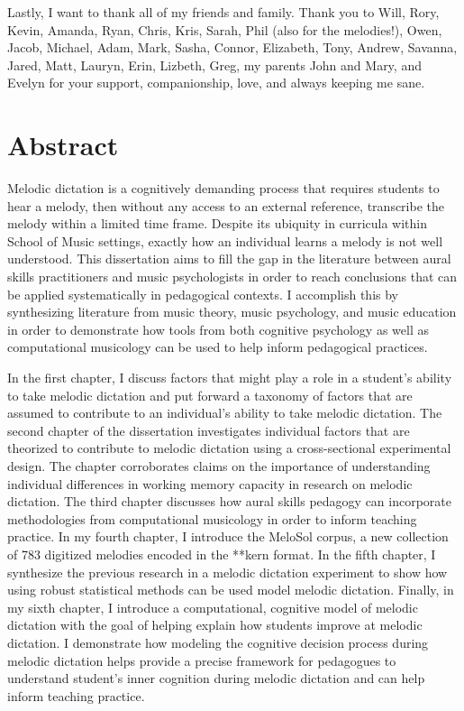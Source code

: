 \documentclass[12pt,]{book}
\begin{document}
Lastly, I want to thank all of my friends and family.
Thank you to Will, Rory, Kevin, Amanda, Ryan, Chris, Kris, Sarah, Phil (also for the melodies!), Owen, Jacob, Michael, Adam, Mark, Sasha, Connor, Elizabeth, Tony, Andrew, Savanna, Jared, Matt, Lauryn, Erin, Lizbeth, Greg, my parents John and Mary, and Evelyn for your support, companionship, love, and always keeping me sane.

{
\setcounter{tocdepth}{1}
\tableofcontents
}
\listoftables
\listoffigures
\cleardoublepage\newpage
\chapter{Abstract}

Melodic dictation is a cognitively demanding process that requires students to hear a melody, then without any access to an external reference, transcribe the melody within a limited time frame.
Despite its ubiquity in curricula within School of Music settings, exactly how an individual learns a melody is not well understood.
This dissertation aims to fill the gap in the literature between aural skills practitioners and music psychologists in order to reach conclusions that can be applied systematically in pedagogical contexts.
I accomplish this by synthesizing literature from music theory, music psychology, and music education in order to demonstrate how tools from both cognitive psychology as well as computational musicology can be used to help inform pedagogical practices.

In the first chapter, I discuss factors that might play a role in a student's ability to take melodic dictation and put forward a taxonomy of factors that are assumed to contribute to an individual's ability to take melodic dictation.
The second chapter of the dissertation investigates individual factors that are theorized to contribute to melodic dictation using a cross-sectional experimental design.
The chapter corroborates claims on the importance of understanding individual differences in working memory capacity in research on melodic dictation.
The third chapter discusses how aural skills pedagogy can incorporate methodologies from computational musicology in order to inform teaching practice.
In my fourth chapter, I introduce the MeloSol corpus, a new collection of 783 digitized melodies encoded in the **kern format.
In the fifth chapter, I synthesize the previous research in a melodic dictation experiment to show how using robust statistical methods can be used model melodic dictation.
Finally, in my sixth chapter, I introduce a computational, cognitive model of melodic dictation with the goal of helping explain how students improve at melodic dictation.
I demonstrate how modeling the cognitive decision process during melodic dictation helps provide a precise framework for pedagogues to understand student's inner cognition during melodic dictation and can help inform teaching practice.
\end{document}
